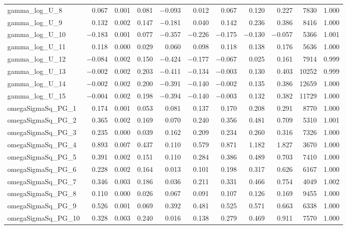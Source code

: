 \documentclass[12pt]{article}
\begin{document}
\begin{longtable}{lrrrrrrrrrr}
gamma\_log\_U\_8  &  0.067 & 0.001 & 0.081 & $-$0.093 &  0.012 &  0.067 &  0.120 &  0.227 &  7830 & 1.000 \\
gamma\_log\_U\_9  &  0.132 & 0.002 & 0.147 & $-$0.181 &  0.040 &  0.142 &  0.236 &  0.386 &  8416 & 1.000 \\
gamma\_log\_U\_10 & $-$0.183 & 0.001 & 0.077 & $-$0.357 & $-$0.226 & $-$0.175 & $-$0.130 & $-$0.057 &  5366 & 1.001 \\
gamma\_log\_U\_11 &  0.118 & 0.000 & 0.029 &  0.060 &  0.098 &  0.118 &  0.138 &  0.176 &  5636 & 1.000 \\
gamma\_log\_U\_12 & $-$0.084 & 0.002 & 0.150 & $-$0.424 & $-$0.177 & $-$0.067 &  0.025 &  0.161 &  7914 & 0.999 \\
gamma\_log\_U\_13 & $-$0.002 & 0.002 & 0.203 & $-$0.411 & $-$0.134 & $-$0.003 &  0.130 &  0.403 & 10252 & 0.999 \\
gamma\_log\_U\_14 & $-$0.002 & 0.002 & 0.200 & $-$0.391 & $-$0.140 & $-$0.002 &  0.135 &  0.386 & 12659 & 1.000 \\
gamma\_log\_U\_15 & $-$0.004 & 0.002 & 0.198 & $-$0.394 & $-$0.140 & $-$0.003 &  0.132 &  0.382 & 11729 & 1.000 \\
\addlinespace
omegaSigmaSq\_PG\_1  & 0.174 & 0.001 & 0.053 & 0.081 & 0.137 & 0.170 & 0.208 & 0.291 &  8770 & 1.000 \\
omegaSigmaSq\_PG\_2  & 0.365 & 0.002 & 0.169 & 0.070 & 0.240 & 0.356 & 0.481 & 0.709 &  5310 & 1.001 \\
omegaSigmaSq\_PG\_3  & 0.235 & 0.000 & 0.039 & 0.162 & 0.209 & 0.234 & 0.260 & 0.316 &  7326 & 1.000 \\
omegaSigmaSq\_PG\_4  & 0.893 & 0.007 & 0.437 & 0.110 & 0.579 & 0.871 & 1.182 & 1.827 &  3670 & 1.000 \\
omegaSigmaSq\_PG\_5  & 0.391 & 0.002 & 0.151 & 0.110 & 0.284 & 0.386 & 0.489 & 0.703 &  7410 & 1.000 \\
omegaSigmaSq\_PG\_6  & 0.228 & 0.002 & 0.164 & 0.013 & 0.101 & 0.198 & 0.317 & 0.626 &  6167 & 1.000 \\
omegaSigmaSq\_PG\_7  & 0.346 & 0.003 & 0.186 & 0.036 & 0.211 & 0.331 & 0.466 & 0.754 &  4049 & 1.002 \\
omegaSigmaSq\_PG\_8  & 0.110 & 0.000 & 0.026 & 0.067 & 0.091 & 0.107 & 0.126 & 0.169 &  9455 & 1.000 \\
omegaSigmaSq\_PG\_9  & 0.526 & 0.001 & 0.069 & 0.392 & 0.481 & 0.525 & 0.571 & 0.663 &  6338 & 1.000 \\
omegaSigmaSq\_PG\_10 & 0.328 & 0.003 & 0.240 & 0.016 & 0.138 & 0.279 & 0.469 & 0.911 &  7570 & 1.000 \\

\end{longtable}
\end{document}
